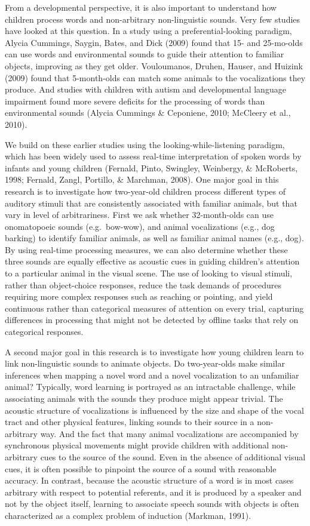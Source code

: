 \documentclass[english,floatsintext,man]{apa6}
\theoremstyle{definition}
\theoremstyle{definition}
\theoremstyle{definition}
\theoremstyle{remark}
\begin{document}
From a developmental perspective, it is also important to understand how
children process words and non-arbitrary non-linguistic sounds. Very few
studies have looked at this question. In a study using a
preferential-looking paradigm, Alycia Cummings, Saygin, Bates, and Dick
(2009) found that 15- and 25-mo-olds can use words and environmental
sounds to guide their attention to familiar objects, improving as they
get older. Vouloumanos, Druhen, Hauser, and Huizink (2009) found that
5-month-olds can match some animals to the vocalizations they produce.
And studies with children with autism and developmental language
impairment found more severe deficits for the processing of words than
environmental sounds (Alycia Cummings \& Ceponiene, 2010; McCleery et
al., 2010).

We build on these earlier studies using the looking-while-listening
paradigm, which has been widely used to assess real-time interpretation
of spoken words by infants and young children (Fernald, Pinto, Swingley,
Weinbergy, \& McRoberts, 1998; Fernald, Zangl, Portillo, \& Marchman,
2008). One major goal in this research is to investigate how
two-year-old children process different types of auditory stimuli that
are consistently associated with familiar animals, but that vary in
level of arbitrariness. First we ask whether 32-month-olds can use
onomatopoeic sounds (e.g.~bow-wow), and animal vocalizations (e.g., dog
barking) to identify familiar animals, as well as familiar animal names
(e.g., dog). By using real-time processing measures, we can also
determine whether these three sounds are equally effective as acoustic
cues in guiding children's attention to a particular animal in the
visual scene. The use of looking to visual stimuli, rather than
object-choice responses, reduce the task demands of procedures requiring
more complex responses such as reaching or pointing, and yield
continuous rather than categorical measures of attention on every trial,
capturing differences in processing that might not be detected by
offline tasks that rely on categorical responses.

A second major goal in this research is to investigate how young
children learn to link non-linguistic sounds to animate objects. Do
two-year-olds make similar inferences when mapping a novel word and a
novel vocalization to an unfamiliar animal? Typically, word learning is
portrayed as an intractable challenge, while associating animals with
the sounds they produce might appear trivial. The acoustic structure of
vocalizations is influenced by the size and shape of the vocal tract and
other physical features, linking sounds to their source in a
non-arbitrary way. And the fact that many animal vocalizations are
accompanied by synchronous physical movements might provide children
with additional non-arbitrary cues to the source of the sound. Even in
the absence of additional visual cues, it is often possible to pinpoint
the source of a sound with reasonable accuracy. In contrast, because the
acoustic structure of a word is in most cases arbitrary with respect to
potential referents, and it is produced by a speaker and not by the
object itself, learning to associate speech sounds with objects is often
characterized as a complex problem of induction (Markman, 1991).
\end{document}

